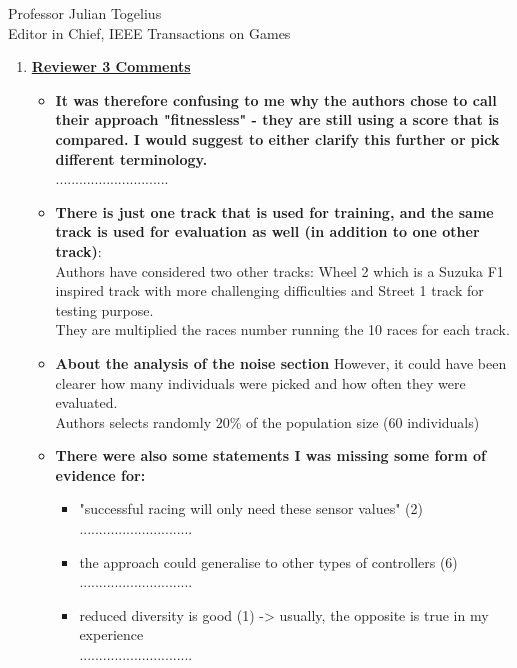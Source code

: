 \documentclass[10pt]{letter} %
\begin{document}
\begin{letter}{Professor Julian Togelius \\ Editor in Chief, IEEE Transactions on Games}
\begin{enumerate}
\item {\bf \underline{ Reviewer 3 Comments}}\\
	\begin{itemize}
	\item {\bf It was therefore confusing to me why the authors chose to call their approach "fitnessless" - they are still using a score that is compared. I would suggest to either clarify this further or pick different terminology.}\\
.............................
		\item {\bf	There is just one track that is used for training, and the same track is used for evaluation as well (in addition to one other track)}:\\
		Authors have considered two other tracks: Wheel 2 which is a Suzuka F1 inspired track with more challenging difficulties and Street 1 track for testing purpose.\\
		They are multiplied the races number running the  10 races for each track.
		\item {\bf	About the analysis of the noise section} However, it could have been clearer how many individuals were picked and how often they were evaluated.\\
		Authors selects randomly $20\%$ of the population size (60 individuals)
	
		\item {\bf There were also some statements I was missing some form of evidence for:}
			\begin{itemize}
			\item	"successful racing will only need these sensor values" (2)\\
.............................
			\item	the approach could generalise to other types of controllers (6)\\
.............................
			\item	reduced diversity is good (1) -> usually, the opposite is true in my experience\\
.............................
			\end{itemize}


\end{itemize}
\end{enumerate}
\end{letter}
\end{document}
